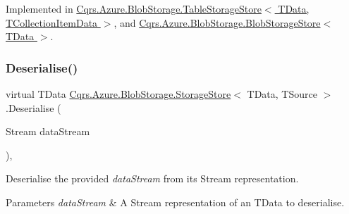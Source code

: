 Implemented in \hyperlink{classCqrs_1_1Azure_1_1BlobStorage_1_1TableStorageStore_ad504317a3b2c07172f50b8e7b8d0f78e_ad504317a3b2c07172f50b8e7b8d0f78e}{Cqrs.\+Azure.\+Blob\+Storage.\+Table\+Storage\+Store$<$ T\+Data, T\+Collection\+Item\+Data $>$}, and \hyperlink{classCqrs_1_1Azure_1_1BlobStorage_1_1BlobStorageStore_a68828f9e6c1f0d297623e5f0c9af0e7e_a68828f9e6c1f0d297623e5f0c9af0e7e}{Cqrs.\+Azure.\+Blob\+Storage.\+Blob\+Storage\+Store$<$ T\+Data $>$}.

\mbox{\label{classCqrs_1_1Azure_1_1BlobStorage_1_1StorageStore_a211bc47bff1108d10e319fee8b9769a0_a211bc47bff1108d10e319fee8b9769a0}} 
\subsubsection{\texorpdfstring{Deserialise()}{Deserialise()}\hspace{0.1cm}{\footnotesize\ttfamily [1/2]}}
{\footnotesize\ttfamily virtual T\+Data \hyperlink{classCqrs_1_1Azure_1_1BlobStorage_1_1StorageStore}{Cqrs.\+Azure.\+Blob\+Storage.\+Storage\+Store}$<$ T\+Data, T\+Source $>$.Deserialise (\begin{DoxyParamCaption}\item[{Stream}]{data\+Stream }\end{DoxyParamCaption})\hspace{0.3cm}{\ttfamily [protected]}, {\ttfamily [virtual]}}



Deserialise the provided {\itshape data\+Stream}  from its Stream representation. 


\begin{DoxyParams}{Parameters}
{\em data\+Stream} & A Stream representation of an T\+Data to deserialise.\\
\hline
\end{DoxyParams}
\mbox{\label{classCqrs_1_1Azure_1_1BlobStorage_1_1StorageStore_adea25452991418693ed966797581f67f_adea25452991418693ed966797581f67f}} 
